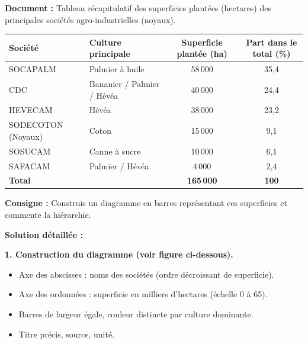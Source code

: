 \documentclass[11pt]{article}
\begin{document}
\begin{exoresolu}
\textbf{Document :} Tableau récapitulatif des superficies plantées (hectares) des principales sociétés agro-industrielles (noyaux).

\begin{center}
\begin{tabularx}{\linewidth}{|l|X|c|c|}
\hline
\rowcolor{popblueL}
\textbf{Société} & \textbf{Culture principale} & \textbf{Superficie plantée (ha)} & \textbf{Part dans le total (\%)} \\
\hline
SOCAPALM & Palmier à huile & 58\,000 & 35,4 \\
CDC & Bananier / Palmier / Hévéa & 40\,000 & 24,4 \\
HEVECAM & Hévéa & 38\,000 & 23,2 \\
SODECOTON (Noyaux) & Coton & 15\,000 & 9,1 \\
SOSUCAM & Canne à sucre & 10\,000 & 6,1 \\
SAFACAM & Palmier / Hévéa & 4\,000 & 2,4 \\
\hline
\textbf{Total} & & \textbf{165\,000} & \textbf{100} \\
\hline
\end{tabularx}
\end{center}

\textbf{Consigne :} Construis un diagramme en barres représentant ces superficies et commente la hiérarchie.

\tcblower
\textbf{Solution détaillée :}

\textbf{1. Construction du diagramme (voir figure ci-dessous).}
\begin{itemize}
    \item Axe des abscisses : noms des sociétés (ordre décroissant de superficie).
    \item Axe des ordonnées : superficie en milliers d'hectares (échelle 0 à 65).
    \item Barres de largeur égale, couleur distincte par culture dominante.
    \item Titre précis, source, unité.
\end{itemize}


\end{exoresolu}
\end{document}
